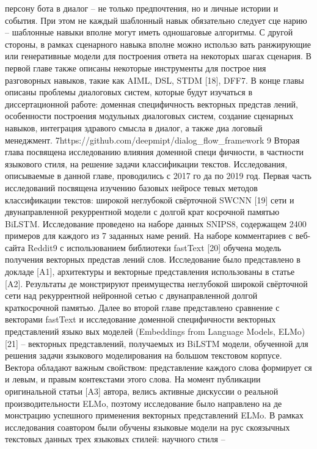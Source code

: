 персону бота в диалог – не только предпочтения, но и личные истории и
события. При этом не каждый шаблонный навык обязательно следует сце
нарию – шаблонные навыки вполне могут иметь одношаговые алгоритмы.
С другой стороны, в рамках сценарного навыка вполне можно использо
вать ранжирующие или генеративные модели для построения ответа на
некоторых шагах сценария.
В первой главе также описаны некоторые инструменты для построе
ния разговорных навыков, такие как AIML, DSL, STDM [18], DFF7. В конце
главы описаны проблемы диалоговых систем, которые будут изучаться
в диссертационной работе: доменная специфичность векторных представ
лений, особенности построения модульных диалоговых систем, создание
сценарных навыков, интеграция здравого смысла в диалог, а также диа
логовый менеджмент.
7https://github.com/deepmipt/dialog_flow_framework
9
Вторая глава посвящена исследованию влияния доменной специ
фичности, в частности языкового стиля, на решение задачи классификации
текстов. Исследования, описываемые в данной главе, проводились с 2017 го
да по 2019 год.
Первая часть исследований посвящена изучению базовых нейросе
тевых методов классификации текстов: широкой неглубокой свёрточной
SWCNN [19] сети и двунаправленной рекуррентной модели с долгой крат
косрочной памятью BiLSTM. Исследование проведено на наборе данных
SNIPS8, содержащем 2400 примеров для каждого из 7 заданных наме
рений. На наборе комментариев с веб-сайта Reddit9 с использованием
библиотеки fastText [20] обучена модель получения векторных представ
лений слов. Исследование было представлено в докладе [A1], архитектуры
и векторные представления использованы в статье [A2]. Результаты де
монстрируют преимущества неглубокой широкой свёрточной сети над
рекуррентной нейронной сетью с двунаправленной долгой краткосрочной
памятью.
Далее во второй главе представлено сравнение с векторами fastText
и исследование доменной специфичности векторных представлений языко
вых моделей (Embeddings from Language Models, ELMo) [21] – векторных
представлений, получаемых из BiLSTM модели, обученной для решения
задачи языкового моделирования на большом текстовом корпусе. Вектора
обладают важным свойством: представление каждого слова формирует
ся и левым, и правым контекстами этого слова. На момент публикации
оригинальной статьи [A3] автора, велись активные дискуссии о реальной
производительности ELMo, поэтому исследование было направлено на де
монстрацию успешного применения векторных представлений ELMo. В
рамках исследования соавтором были обучены языковые модели на рус
скоязычных текстовых данных трех языковых стилей: научного стиля –
